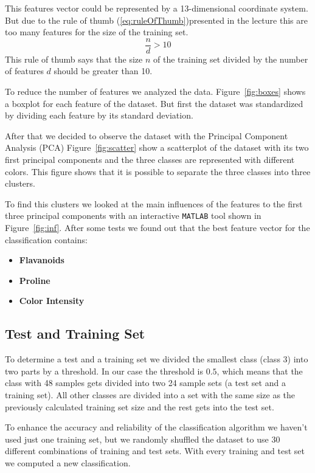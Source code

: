 \documentclass[subfigure,epsfig,fleqn,amssmb,float,caption,ausarbeitung]{scrartcl}
\begin{document}
This features vector could be represented by a 13-dimensional coordinate 
system. But due to the rule of thumb (\ref{eq:ruleOfThumb})presented in the 
lecture this are too many features for the size of the training set.
\begin{equation}
\label{eq:ruleOfThumb}
	\frac{n}{d} > 10
\end{equation}
This rule of thumb says that the size $n$ of the training set divided by the 
number of features $d$ should be greater than 10.

To reduce the number of features we analyzed the data. Figure~\ref{fig:boxes} 
shows a boxplot for each feature of the dataset. But first the dataset was 
standardized by dividing each feature by its standard deviation.

After that we decided to observe the dataset with the Principal Component 
Analysis (PCA) Figure~\ref{fig:scatter} show a scatterplot of the dataset 
with its two first principal components and the three classes are represented 
with different colors. This figure shows that it is possible to separate the 
three classes into three clusters. 

To find this clusters we looked at the main influences of the features to the 
first three principal components with an interactive \texttt{MATLAB} tool 
shown in Figure~\ref{fig:inf}. After some tests we found out that the best feature vector for the classification contains:

\begin{itemize}
	\item \textbf{Flavanoids}
	\item \textbf{Proline}
	\item \textbf{Color Intensity}
\end{itemize}


\subsection{Test and Training Set}
\label{sec:kNNtestset}

To determine a test and a training set we divided the smallest class (class 3)
 into two parts by a threshold. In our case the threshold is $0.5$, which 
means that the class with 48 samples gets divided into two 24 sample sets (a 
test set and a training set). All other classes are divided into a set with 
the same size as the previously calculated training set size and the rest 
gets into the test set.

To enhance the accuracy and reliability of the classification algorithm we 
haven't used just one training set, but we randomly shuffled the dataset to 
use 30 different combinations of training and test sets. With every training 
and test set we computed a new classification.
\end{document}

